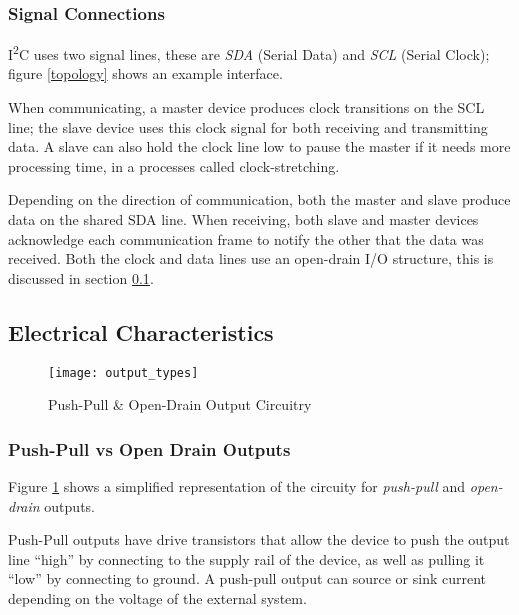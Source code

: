 \documentclass[openany,11pt,fleqn]{book} %
\begin{document}
        \subsubsection{\color{orange}Signal Connections}
            I\textsuperscript{2}C uses two signal lines, these are \textit{SDA} (Serial Data) and \textit{SCL} (Serial Clock); figure \ref{topology} shows an example interface. 
            
            When communicating, a master device produces clock transitions on the SCL line; the slave device uses this clock signal for both receiving and transmitting data. A slave can also hold the clock line low to pause the master if it needs more processing time, in a processes called clock-stretching.
            
            Depending on the direction of communication, both the master and slave produce data on the shared SDA line. When receiving, both slave and master devices acknowledge each communication frame to notify the other that the data was received.  Both the clock and data lines use an open-drain I/O structure, this is discussed in section \ref{electrical}. 
            
    \subsection{\color{orange}Electrical Characteristics} \label{electrical}
        \begin{figure}[]
            \centering\texttt{[image: output\_types]}
            \caption{Push-Pull \& Open-Drain Output Circuitry}
            \label{output_circuit}
        \end{figure}
        
        \subsubsection{\color{orange}Push-Pull vs Open Drain Outputs}
        Figure \ref{output_circuit} shows a simplified representation of the circuity for \textit{push-pull} and \textit{open-drain} outputs. 
        
        
        Push-Pull outputs have drive transistors that allow the device to push the output line ``high'' by connecting to the supply rail of the device, as well as pulling it ``low'' by connecting to ground. A push-pull output can source or sink current depending on the voltage of the external system. 
        
\end{document}
